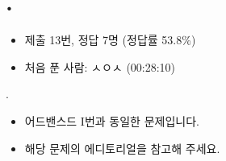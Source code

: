 
\section{\texorpdfstring{\pletter. \ptitle}{문제 \pletter}}

\begin{frame}[label=problem-J]
    \sectiontitle{\pletter}{\ptitle}
    \begin{itemize}
        \item 제출 13번, 정답 7명 (정답률 53.8\%)
        \item 처음 푼 사람: ㅅㅇㅅ (00:28:10)
    \end{itemize}
\end{frame}

\begin{frame}{\textbf{\pletter}. \ptitle}
\begin{itemize}
        \item 어드밴스드 I번과 동일한 문제입니다.
        \item 해당 문제의 에디토리얼을 참고해 주세요.
    \end{itemize}
    \begin{center}
    \end{center}
\end{frame}
